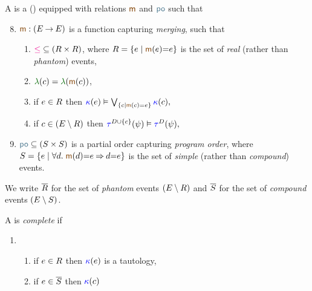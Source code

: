 \begin{definition}
  \label{def:po}
  A \PwTc{} is a \PwT{} () equipped
  with relations $\rmrg$ and
  $\rpox$ such that 
  \begin{enumerate}[,label=(\textsc{m}\arabic*),ref=\textsc{m}\arabic*]
    \setcounter{enumi}{7}
  \item \label{pom-m} 
    $\fmrg{} : (\aEvs\fun\aEvs)$
    is a function capturing \emph{merging}, such that 
    \begin{enumerate}%
    \item \label{pom-m-real} 
      ${\le}\subseteq(\reEvs\times\reEvs)$,
      where $\reEvs=\{\aEv\mid\fmrg{\aEv}{=}\aEv\}$ is the set of
      \emph{real} (rather than \emph{phantom}) events,
    \item \label{pom-m-lambda} 
      $\labeling(\cEv)=\labeling(\fmrg{\cEv})$,
    \item \label{pom-m-kappa} 
      if $e\in R$ then 
      \begin{math}
        \labelingForm(\aEv)\rimplies
        \bigvee_{\{\cEv\mid\fmrg{\cEv}=\aEv\}}\labelingForm(\cEv),
      \end{math}
    \item \label{pom-m-tau} 
      if $c\in(E\setminus R)$ then
      \begin{math}
        \aTr{\bEvs\cup\{\cEv\}}{\bForm}\rimplies \aTr{\bEvs}{\bForm},
      \end{math}
    \end{enumerate}
  \item \label{pom-po} 
    ${\rpox} \subseteq (\umEvs\times\umEvs)$ is a partial order capturing
    \emph{program order}, where 
    $\umEvs=\{\aEv\mid\forall\bEv.\;\fmrg{\bEv}{=}\aEv \limplies \bEv{=}\aEv\}$
    is the set of \emph{simple} (rather than \emph{compound}) events.
  \end{enumerate}
  
  We write $\overline{R}$ for the set of \emph{phantom} events $(E\setminus R)$
  and $\overline{S}$ for the set of \emph{compound} events $(E\setminus S)$.

  A \PwTc{} is \emph{complete} if 
    \begin{enumerate}[,label=(\textsc{c}\arabic*),ref=\textsc{c}\arabic*]

      \setcounter{enumi}{\value{kappa}}
    \item[]
      \begin{enumerate}[leftmargin=0pt]
      \item \label{top-kappa-real}
        if $e\in R$ then ${\color{blue}\kappa}(e)$ is a tautology,
      \item \label{top-kappa-phantom}
        if $e\in\overline{S}$ %
        then
        ${\color{blue}\kappa}(c)$
      \end{enumerate}


\end{enumerate}
\end{definition}
